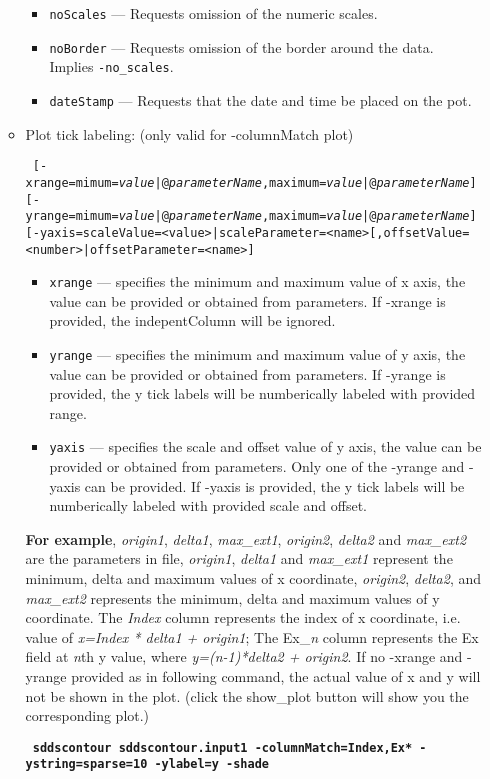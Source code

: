\begin{itemize}
\begin{itemize}
\begin{itemize}
        \item \verb|noScales| --- Requests omission of the numeric scales.
        \item \verb|noBorder| --- Requests omission of the border around the data.  Implies \verb|-no_scales|.
        \item \verb|dateStamp| --- Requests that the date and time be placed on the pot.
        \end{itemize}
    \item Plot tick labeling: (only valid for -columnMatch plot)
\begin{flushleft}{\tt
[-xrange=mimum={\em value}|@{\em parameterName},maximum={\em value}|@{\em parameterName}] [-yrange=mimum={\em value}|@{\em parameterName},maximum={\em value}|@{\em parameterName}] [-yaxis=scaleValue=<value>|scaleParameter=<name>[,offsetValue=<number>|offsetParameter=<name>]
}\end{flushleft}
        \begin{itemize} 
        \item \verb|xrange| --- specifies the minimum and maximum value of x axis, the value can be provided or obtained from parameters. If -xrange is provided, the indepentColumn will be ignored.
        \item \verb|yrange| --- specifies the minimum and maximum value of y axis, the value can be provided or obtained from parameters. If -yrange is provided, the y tick labels will be numberically labeled with provided range.
        \item \verb|yaxis| --- specifies the scale and offset value of y axis, the value can be provided or obtained from parameters. Only one of the -yrange and -yaxis can be provided. If -yaxis is provided, the y tick labels will be numberically labeled with provided scale and offset.
        \end{itemize}
        {\bf For example}, {\em origin1}, {\em delta1}, {\em max\_ext1}, {\em origin2}, {\em delta2} and {\em max\_ext2} are the parameters in  file, {\em origin1}, {\em delta1} and {\em max\_ext1} represent the minimum, delta and maximum values of x coordinate, {\em origin2}, {\em delta2}, and {\em max\_ext2} represents the minimum, delta and maximum values of y coordinate. The {\em Index} column represents the index of x coordinate, i.e. value of {\em x=Index * delta1 + origin1}; The Ex\_{\em n} column represents the Ex field at {\em n}th y value, where {\em y=(n-1)*delta2 + origin2}. If no -xrange and -yrange provided as in following command, the actual value of x and y will not be shown in the plot. (click the show\_plot button will show you the corresponding plot.) 
       \begin{flushleft}{\tt \bf
            sddscontour sddscontour.input1 -columnMatch=Index,Ex* -ystring=sparse=10 -ylabel=y -shade
        }\end{flushleft}


\end{itemize}
\end{itemize}
